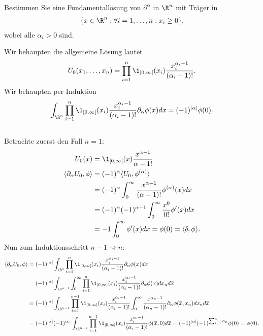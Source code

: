 
\begin{exercise}

Bestimmen Sie eine Fundamentallösung von $\partial^{\alpha}$ in $\R^n$ mit Träger in
\begin{align*}
  \{x \in \R^n: \forall i = 1,\dots,n: x_i \geq 0 \},
\end{align*}
wobei alle $\alpha_i > 0$ sind.
\end{exercise}


\begin{solution}

Wir behaupten die allgemeine Lösung lautet
\begin{align*}
  U_0(x_1,\dots,x_n) = \prod_{i=1}^n \1_{[0,\infty[}(x_i) \frac{x_i^{\alpha_i - 1}}{(\alpha_i - 1)!}.
\end{align*}
Wir behaupten per Induktion
\begin{align*}
  \int_{\R^n}\prod_{i=1}^n \1_{[0,\infty[}(x_i) \frac{x_i^{\alpha_i - 1}}{(\alpha_i - 1)!}\partial_{\alpha}\phi(x)dx = (-1)^{|\alpha|}\phi(0).
\end{align*}\\
Betrachte zuerst den Fall $n=1$:
\begin{align*}
  U_0(x) &= \1_{[0,\infty[}(x)\frac{x^{\alpha-1}}{\alpha-1!} \\
  \langle \partial_{\alpha} U_0, \phi \rangle &= (-1)^{\alpha} \langle U_0, \phi^{(\alpha)} \rangle \\
  &= (-1)^{\alpha} \int_0^{\infty} \frac{x^{\alpha - 1}}{(\alpha - 1)!} \phi^{(\alpha)}(x) dx \\
  &= (-1)^{\alpha}(-1)^{\alpha - 1}\int_0^{\infty}\frac{x^0}{0!}\phi^{\prime}(x)dx \\
  &= -1\int_0^{\infty}\phi^{\prime}(x)dx = \phi(0) = \langle \delta, \phi \rangle.
\end{align*}
Nun zum Induktionsschritt $n-1 \rightsquigarrow n$:
\begin{align*}
  \langle \partial_{\alpha} U_0, \phi \rangle &= (-1)^{|\alpha|}\int_{\R^n}\prod_{i=1}^n \1_{[0,\infty[}(x_i) \frac{x_i^{\alpha_i - 1}}{(\alpha_i - 1)!}\partial_{\alpha}\phi(x)dx \\
  &= (-1)^{|\alpha|}\int_{\R^{n-1}}\int_{0}^{\infty}\prod_{i=1}^n \1_{[0,\infty[}(x_i) \frac{x_i^{\alpha_i - 1}}{(\alpha_i - 1)!}\partial_{\alpha}\phi(x) dx_n d\overline{x} \\
  &= (-1)^{|\alpha|}\int_{\R^{n-1}}\prod_{i=1}^{n-1} \1_{[0,\infty[}(x_i) \frac{x_i^{\alpha_i - 1}}{(\alpha_i - 1)!}\int_{0}^{\infty} \frac{x^{\alpha_n - 1}}{(\alpha_n - 1)!}\partial_{\alpha}\phi(\overline{x},x_n) dx_n d\overline{x} \\
  &= (-1)^{|\alpha|}(-1)^{\alpha_n}\int_{\R^{n-1}}\prod_{i=1}^{n-1} \1_{[0,\infty[}(x_i) \frac{x_i^{\alpha_i - 1}}{(\alpha_i - 1)!}\phi(\overline{x},0)d\overline{x}  = (-1)^{|\alpha|}(-1)^{\sum_{i=1}^n\alpha_n}\phi(0) = \phi(0).\\
\end{align*}
\end{solution}

